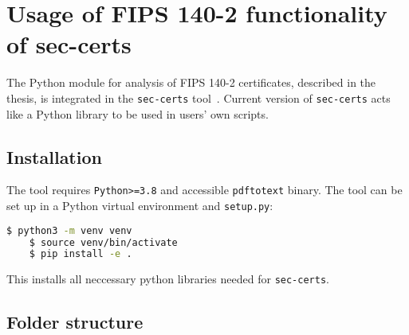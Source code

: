 \renewcommand{\thechapter}{A}
\chapter{Usage of FIPS 140-2 functionality of sec-certs}



\lstset{style=mystyle}


The Python module for analysis of FIPS 140-2 certificates, described in the thesis, is integrated in the \texttt{sec-certs} tool~\cite{sec-certs}. Current version of \texttt{sec-certs} acts like a Python library to be used in users' own scripts. 

\section{Installation}

The tool requires \texttt{Python>=3.8} and accessible \texttt{pdftotext} binary. The tool can be set up in a Python virtual environment and \texttt{setup.py}:

\begin{lstlisting}[language=bash]
    $ python3 -m venv venv
    $ source venv/bin/activate
    $ pip install -e .
\end{lstlisting}
This installs all neccessary python libraries needed for \texttt{sec-certs}.

\section{Folder structure}

